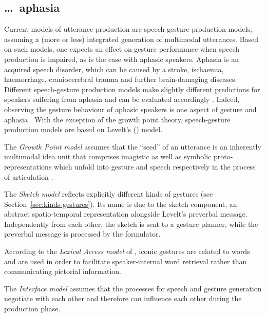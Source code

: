 \documentclass[output=paper]{langsci/langscibook}
\begin{document}
\subsection{\ldots\ aphasia}
\label{sec:aphasia}

Current models of utterance production are speech-gesture production models, assuming a (more or less) integrated generation of multimodal utterances.
%
Based on such models, one expects an effect on gesture performance when speech production is impaired, as is the case with aphasic speakers. 
%
Aphasia  is an acquired speech disorder, which can be caused by a stroke, ischaemia, haemorrhage, craniocerebral trauma and further brain-damaging diseases.
%
Different speech-gesture production models make slightly different predictions for speakers suffering from aphasia and can be evaluated accordingly \citep{deRuiter:deBeer:2013}.
%
Indeed, observing the gesture behaviour of aphasic speakers is one aspect of gesture and aphasia \citep{Jakob:Bartmann:Goldenberg:Ziegler:Hogrefe:2011,Kong:Law:Chak:2017,Sekine:Rose:2013}.
%
With the exception of the growth point theory, speech-gesture production models are based on Levelt's (\citeyear{Levelt:1989})  model.

The \emph{Growth Point model} \citep{McNeill:Duncan:2000} assumes that the \enquote{seed} of an utterance is an inherently multimodal idea unit that comprises imagistic as well as symbolic proto-representations which unfold into gesture and speech respectively in the process of articulation \citetext{see also \citealt{Roepke:2011} on the growth point's entrenchment in contexts and frames}.

The \emph{Sketch model}  \citep{de:Ruiter:2000} reflects explicitly different kinds of gestures (see Section~\ref{sec:kinds-gestures}). 
%
Its name is due to the sketch component, an abstract spatio-temporal representation alongside Levelt's preverbal message. 
%
Independently from each other, the sketch is sent to a gesture planner, while the preverbal message is processed by the formulator.

According to the \emph{Lexical Access model}  of \citet{Krauss:Chen:Gottesmann:2000}, iconic gestures are related to words and are used in order to facilitate speaker-internal word retrieval rather than communicating pictorial information.

The \emph{Interface model}  \citep{Kita:Ozyurek:2003} assumes that the processes for speech and gesture generation negotiate with each other and therefore can influence each other during the production phase.
\end{document}
